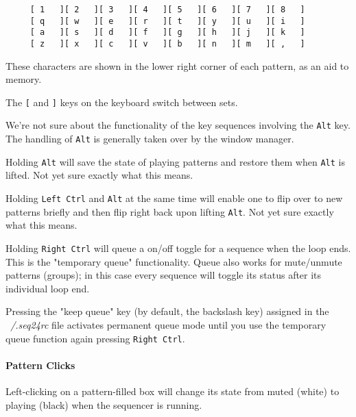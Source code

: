    \begin{verbatim}
     [ 1   ][ 2   ][ 3   ][ 4   ][ 5   ][ 6   ][ 7   ][ 8   ]
     [ q   ][ w   ][ e   ][ r   ][ t   ][ y   ][ u   ][ i   ]
     [ a   ][ s   ][ d   ][ f   ][ g   ][ h   ][ j   ][ k   ]
     [ z   ][ x   ][ c   ][ v   ][ b   ][ n   ][ m   ][ ,   ]
   \end{verbatim}

   These characters are shown in the lower right corner of each
   pattern, as an aid to memory.

   \index{keys![}
   The \texttt{[} and
   \index{keys!]}
   \texttt{]} keys on the keyboard
   switch between sets.

   We're not sure about the functionality of the key sequences involving the 
   \texttt{Alt} key.  The handling of
   \texttt{Alt} is generally taken over by the window manager.

   Holding \texttt{Alt} will save the state of playing patterns and restore
   them when \texttt{Alt} is lifted.  Not yet sure exactly what this means.

   Holding \texttt{Left Ctrl} and \texttt{Alt} at the same time will enable
   one to flip over to new patterns briefly and then flip right back upon
   lifting \texttt{Alt}.  Not yet sure exactly what this means.

	Holding \texttt{Right Ctrl} will queue a on/off toggle for a 
	sequence when the loop ends. This is the "temporary queue" functionality.
   Queue also works for mute/unmute 
	patterns (groups); in this case every sequence will toggle 
	its status after its individual loop end. 

	Pressing the "keep queue" key (by default, the backslash key)
   assigned in the \textsl{~/.seq24rc} file
	activates permanent queue mode until you use the temporary 
	queue function again pressing \texttt{Right Ctrl}. 

\paragraph{Pattern Clicks}
\label{paragraph:seq24_patterns_pattern_Clicks}

   Left-clicking on a pattern-filled box will change its state
   from muted (white) to playing (black) when
   the sequencer is running.

